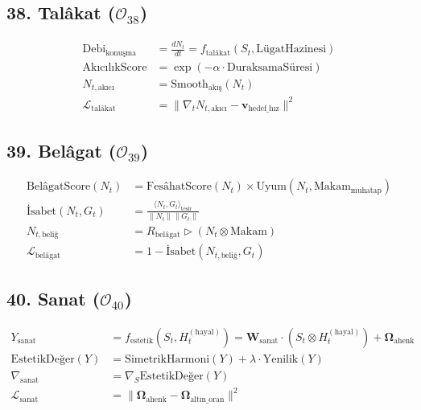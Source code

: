 \documentclass[11pt, a4paper]{article}
\begin{document}
\subsection{38. Talâkat ($\mathcal{O}_{38}$)}
\begin{align}
\text{Debi}_{\text{konuşma}} &= \frac{d N_t}{d t} = f_{\text{talâkat}}(S_t, \text{LügatHazinesi}) \\
\text{AkıcılıkScore} &= \exp\left( -\alpha \cdot \text{DuraksamaSüresi} \right) \\
N_{t, \text{akıcı}} &= \text{Smooth}_{\text{akış}}(N_t) \\
\mathcal{L}_{\text{talâkat}} &= \| \nabla_t N_{t, \text{akıcı}} - \mathbf{v}_{\text{hedef\_hız}} \|^2
\end{align}

\subsection{39. Belâgat ($\mathcal{O}_{39}$)}
\begin{align}
\text{BelâgatScore}(N_t) &= \text{FesâhatScore}(N_t) \times \text{Uyum}\left( N_t, \text{Makam}_{\text{muhatap}} \right) \\
\text{İsabet}(N_t, G_t) &= \frac{\langle N_t, G_t \rangle_{\text{tesir}}}{\|N_t\| \|G_t\|} \\
N_{t, \text{beliğ}} &= R_{\text{belâgat}} \triangleright (N_t \otimes \text{Makam}) \\
\mathcal{L}_{\text{belâgat}} &= 1 - \text{İsabet}(N_{t, \text{beliğ}}, G_t)
\end{align}

\subsection{40. Sanat ($\mathcal{O}_{40}$)}
\begin{align}
Y_{\text{sanat}} &= f_{\text{estetik}}(S_t, H_t^{(\text{hayal})}) = \mathbf{W}_{\text{sanat}} \cdot \left( S_t \otimes H_t^{(\text{hayal})} \right) + \mathbf{\Omega}_{\text{ahenk}} \\
\text{EstetikDeğer}(Y) &= \text{SimetrikHarmoni}(Y) + \lambda \cdot \text{Yenilik}(Y) \\
\nabla_{\text{sanat}} &= \nabla_S \text{EstetikDeğer}(Y) \\
\mathcal{L}_{\text{sanat}} &= \|\mathbf{\Omega}_{\text{ahenk}} - \mathbf{\Omega}_{\text{altın\_oran}}\|^2
\end{align}
\end{document}
